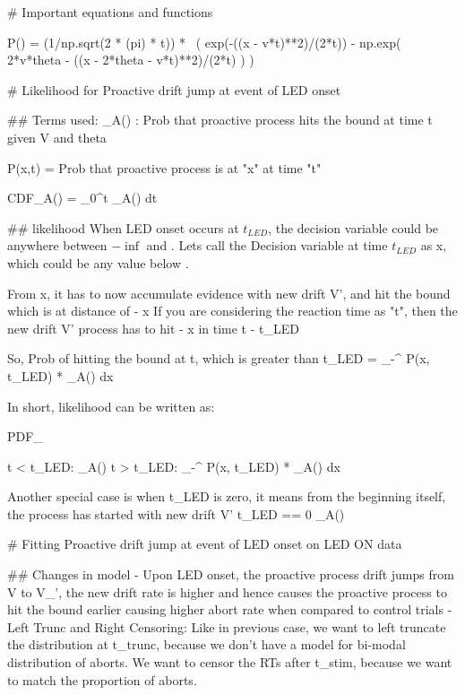 # Important equations and functions

P()  =  (1/np.sqrt(2 * (pi) * t)) * \
        ( exp(-((x - v*t)**2)/(2*t)) - np.exp( 2*v*theta - ((x - 2*theta - v*t)**2)/(2*t) ) )


        

# Likelihood for Proactive drift jump at event of LED onset


## Terms used: 
\rho_A() : Prob that proactive process hits the bound at time t given V and theta

P(x,t) = Prob that proactive process is at "x" at time "t"

CDF_A() = \int_{0}^{t} \rho_A() dt

## likelihood 
When LED onset occurs at $ t_{LED} $, the decision variable could be anywhere between $-\inf$ and \theta. 
Lets call the Decision variable at time $ t_{LED} $ as x, which could be any value below \theta.

From x, it has to now accumulate evidence with new drift V', and hit the bound which is at distance of \theta - x
If you are considering the reaction time as "t", then the new drift V' process has to hit \theta - x in time t - t_{LED}

So, Prob of hitting the bound at t, which is greater than t_LED
 = \int_{-\inf}^{\theta} P(x, t_{LED}) * \rho_A() dx

 In short, likelihood can be written as:

 PDF_{}
 
t < t_LED: \rho_A()
t > t_LED: \int_{-\inf}^{\theta} P(x, t_{LED}) * \rho_A() dx

Another special case is when t_LED is zero, it means from the beginning itself, the process has started with new drift V'
t_LED == 0 \rho_A(\frac{t}{V', \theta})


# Fitting Proactive drift jump at event of LED onset on LED ON data


## Changes in model
- Upon LED onset, the proactive process drift jumps from V to V_', the new drift rate is higher and hence causes the 
proactive process to hit the bound earlier causing higher abort rate when compared to control trials
- Left Trunc and Right Censoring: Like in previous case, we want to left truncate the distribution at t_trunc, because we don't have a model for 
bi-modal distribution of aborts. We want to censor the RTs after t_stim, because we want to match the proportion of aborts.


